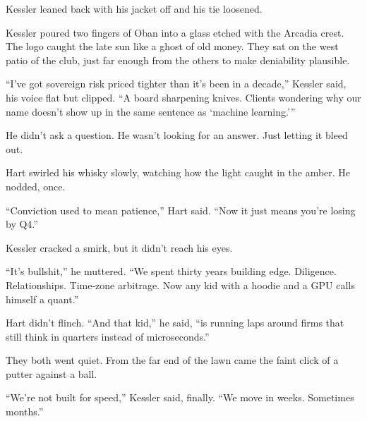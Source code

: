 Kessler leaned back with his jacket off and his tie loosened.

Kessler poured two fingers of Oban into a glass etched with the Arcadia crest. The logo caught the late sun like a ghost 
of old money.  They sat on the west patio of the club, 
just far enough from the others to make deniability plausible.

“I’ve got sovereign risk priced tighter than it’s been in a decade,” Kessler said, his voice flat but clipped. “A board 
sharpening knives. Clients wondering why our name doesn’t show up in the same sentence as ‘machine learning.’”

He didn’t ask a question. He wasn’t looking for an answer. Just letting it bleed out.

Hart swirled his whisky slowly, watching how the light caught in the amber. He nodded, once.

“Conviction used to mean patience,” Hart said. “Now it just means you’re losing by Q4.”

Kessler cracked a smirk, but it didn’t reach his eyes.

“It’s bullshit,” he muttered. “We spent thirty years building edge. Diligence. Relationships. Time-zone 
arbitrage.  Now any kid with a hoodie and a GPU calls himself a quant.”

Hart didn’t flinch. “And that kid,” he said, “is running laps around firms that still think in quarters instead 
of microseconds.”

They both went quiet. From the far end of the lawn came the faint click of a putter against a ball.

“We’re not built for speed,” Kessler said, finally. “We move in weeks. Sometimes months.”

\medskip

